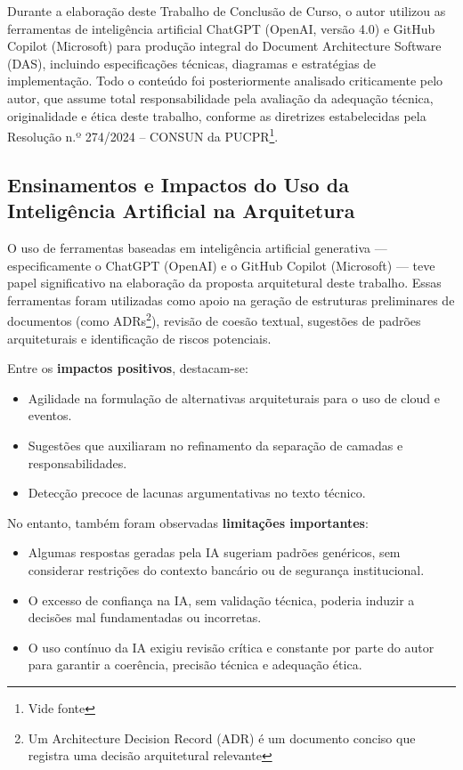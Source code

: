 Durante a elaboração deste Trabalho de Conclusão de Curso, o autor utilizou as ferramentas de inteligência artificial ChatGPT (OpenAI, versão 4.0) e GitHub Copilot (Microsoft) para produção integral do Document Architecture Software (DAS), incluindo especificações técnicas, diagramas e estratégias de implementação. Todo o conteúdo foi posteriormente analisado criticamente pelo autor, que assume total responsabilidade pela avaliação da adequação técnica, originalidade e ética deste trabalho, conforme as diretrizes estabelecidas pela Resolução n.º 274/2024 – CONSUN da PUCPR\footnote{Vide fonte }.

\subsection{Ensinamentos e Impactos do Uso da Inteligência Artificial na Arquitetura}

O uso de ferramentas baseadas em inteligência artificial generativa — especificamente o ChatGPT (OpenAI) e o GitHub Copilot (Microsoft) — teve papel significativo na elaboração da proposta arquitetural deste trabalho. Essas ferramentas foram utilizadas como apoio na geração de estruturas preliminares de documentos (como ADRs\footnote{Um Architecture Decision Record (ADR) é um documento conciso que registra uma decisão arquitetural relevante}), revisão de coesão textual, sugestões de padrões arquiteturais e identificação de riscos potenciais.

Entre os \textbf{impactos positivos}, destacam-se:
\begin{itemize}
	\item Agilidade na formulação de alternativas arquiteturais para o uso de cloud e eventos.
	\item Sugestões que auxiliaram no refinamento da separação de camadas e responsabilidades.
	\item Detecção precoce de lacunas argumentativas no texto técnico.
\end{itemize}

No entanto, também foram observadas \textbf{limitações importantes}:
\begin{itemize}
	\item Algumas respostas geradas pela IA sugeriam padrões genéricos, sem considerar restrições do contexto bancário ou de segurança institucional.
	\item O excesso de confiança na IA, sem validação técnica, poderia induzir a decisões mal fundamentadas ou incorretas.
	\item O uso contínuo da IA exigiu revisão crítica e constante por parte do autor para garantir a coerência, precisão técnica e adequação ética.
\end{itemize}

